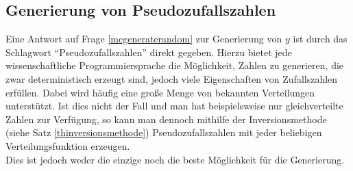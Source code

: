 \subsection{Generierung von Pseudozufallszahlen}
Eine Antwort auf Frage \ref{mcgeneraterandom} zur Generierung von $y$ ist durch das Schlagwort "`Pseudozufallszahlen"' direkt gegeben. Hierzu bietet jede wissenschaftliche Programmiersprache die Möglichkeit, Zahlen zu generieren, die zwar deterministisch erzeugt sind, jedoch viele Eigenschaften von Zufallszahlen erfüllen. Dabei wird häufig eine große Menge von bekannten Verteilungen unterstützt. Ist dies nicht der Fall und man hat beispielsweise nur gleichverteilte Zahlen zur Verfügung, so kann man dennoch mithilfe der Inversionsmethode (siehe Satz \ref{thinversionsmethode}) Pseudozufallszahlen mit jeder beliebigen Verteilungsfunktion erzeugen.\\
Dies ist jedoch weder die einzige noch die beste Möglichkeit für die Generierung.
